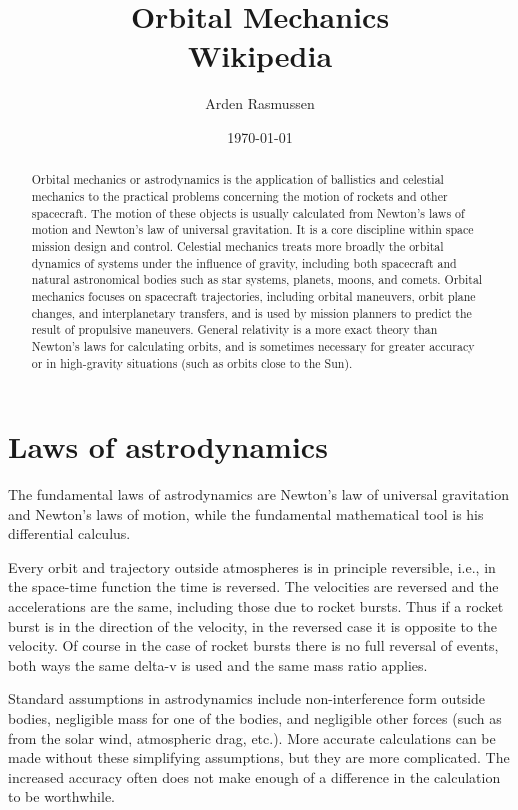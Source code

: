 \documentclass[12pt]{article}
\title{Orbital Mechanics\\\small{Wikipedia}}
\date{\today}
\author{Arden Rasmussen}
\begin{document}
\maketitle
\newpage
{}
\begin{abstract}
  Orbital mechanics or astrodynamics is the application of ballistics and
  celestial mechanics to the practical problems concerning the motion of
  rockets and other spacecraft. The motion of these objects is usually
  calculated from Newton's laws of motion and Newton's law of universal
  gravitation. It is a core discipline within space mission design and control.
  Celestial mechanics treats more broadly the orbital dynamics of systems under
  the influence of gravity, including both spacecraft and natural astronomical
  bodies such as star systems, planets, moons, and comets. Orbital mechanics
  focuses on spacecraft trajectories, including orbital maneuvers, orbit plane
  changes, and interplanetary transfers, and is used by mission planners to
  predict the result of propulsive maneuvers. General relativity is a more
  exact theory than Newton's laws for calculating orbits, and is sometimes
  necessary for greater accuracy or in high-gravity situations (such as orbits
  close to the Sun).
\end{abstract}
\newpage
\tableofcontents
\newpage
{}

\section{Laws of astrodynamics}

The fundamental laws of astrodynamics are Newton's law of universal gravitation
and Newton's laws of motion, while the fundamental mathematical tool is his
differential calculus.

Every orbit and trajectory outside atmospheres is in principle reversible,
i.e., in the space-time function the time is reversed. The velocities are
reversed and the accelerations are the same, including those due to rocket
bursts. Thus if a rocket burst is in the direction of the velocity, in the
reversed case it is opposite to the velocity. Of course in the case of rocket
bursts there is no full reversal of events, both ways the same delta-v is used
and the same mass ratio applies.

Standard assumptions in astrodynamics include non-interference form outside
bodies, negligible mass for one of the bodies, and negligible other forces
(such as from the solar wind, atmospheric drag, etc.). More accurate
calculations can be made without these simplifying assumptions, but they are
more complicated. The increased accuracy often does not make enough of a
difference in the calculation to be worthwhile.
\end{document}
